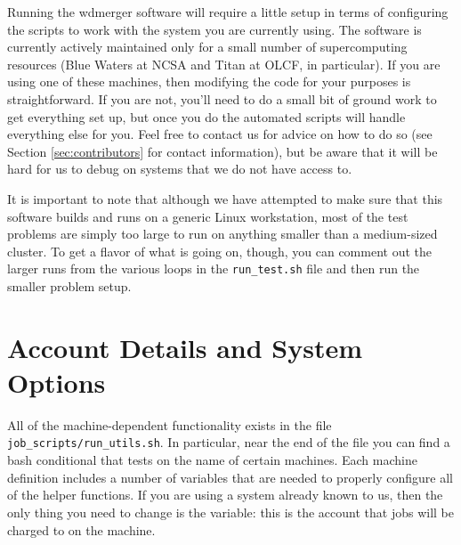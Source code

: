 \documentclass[12pt]{book}
\begin{document}
Running the wdmerger software will require a little setup in terms of configuring the 
scripts to work with the system you are currently using. The software is currently actively 
maintained only for a small number of supercomputing resources (Blue Waters at NCSA 
and Titan at OLCF, in particular). If you are using one of these machines, then 
modifying the code for your purposes is straightforward. If you are not, you'll need to do a 
small bit of ground work to get everything set up, but once you do the automated scripts 
will handle everything else for you. Feel free to contact us for advice on how to do so 
(see Section \ref{sec:contributors} for contact information), but be aware that it will be 
hard for us to debug on systems that we do not have access to. 

It is important to note that although we have attempted to 
make sure that this software builds and runs on a generic Linux workstation, most of the test 
problems are simply too large to run on anything smaller than a medium-sized cluster. To get a flavor 
of what is going on, though, you can comment out the larger runs from the various loops in the 
\texttt{run\_test.sh} file and then run the smaller problem setup.

\section{Account Details and System Options}

All of the machine-dependent functionality exists in the file \texttt{job\_scripts/run\_utils.sh}.
In particular, near the end of the file you can find a bash conditional that tests on the name of 
certain machines. Each machine definition includes a number of variables that are needed to 
properly configure all of the helper functions. If you are using a system already known to us,
then the only thing you need to change is the  variable: this is the account 
that jobs will be charged to on the machine. 
\end{document}
